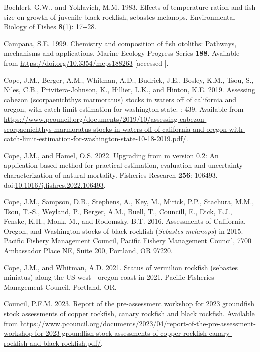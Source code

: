 \documentclass[11pt,
  english,
  letterpaper,
]{article}
\newlength{\cslhangindent}
\newenvironment{CSLReferences}[2] %
 {%
  \setlength{\parindent}{0pt}
  \ifodd #1 \everypar{\setlength{\hangindent}{\cslhangindent}}\ignorespaces\fi
  \ifnum #2 > 0
  \setlength{\parskip}{#2\baselineskip}
  \fi
 }%
 {}
\begin{document}
\begin{CSLReferences}{1}{0}
\leavevmode{}%
Boehlert, G.W., and Yoklavich, M.M. 1983. Effects of temperature ration and fish size on growth of juvenile black rockfish, sebastes melanops. Environmental Biology of Fishes \textbf{8}(1): 17-\/-28.

\leavevmode{}%
Campana, S.E. 1999. Chemistry and composition of fish otoliths: Pathways, mechanisms and applications. Marine Ecology Progress Series \textbf{188}. Available from \url{https://doi.org/10.3354/meps188263} {[}accessed {]}.

\leavevmode{}%
Cope, J.M., Berger, A.M., Whitman, A.D., Budrick, J.E., Bosley, K.M., Tsou, S., Niles, C.B., Privitera-Johnson, K., Hillier, L.K., and Hinton, K.E. 2019. Assessing cabezon (scorpaenichthys marmoratus) stocks in waters off of california and oregon, with catch limit estimation for washington state. : 439. Available from \url{https://www.pcouncil.org/documents/2019/10/assessing-cabezon-scorpaenichthys-marmoratus-stocks-in-waters-off-of-california-and-oregon-with-catch-limit-estimation-for-washington-state-10-18-2019.pdf/}.

\leavevmode{}%
Cope, J.M., and Hamel, O.S. 2022. Upgrading from m version 0.2: An application-based method for practical estimation, evaluation and uncertainty characterization of natural mortality. Fisheries Research \textbf{256}: 106493. doi:\href{https://doi.org/10.1016/j.fishres.2022.106493}{10.1016/j.fishres.2022.106493}.

\leavevmode{}%
Cope, J.M., Sampson, D.B., Stephens, A., Key, M., Mirick, P.P., Stachura, M.M., Tsou, T.-S., Weyland, P., Berger, A.M., Buell, T., Councill, E., Dick, E.J., Fenske, K.H., Monk, M., and Rodomsky, B.T. 2016. Assessments of {California}, {Oregon}, and {Washington} stocks of black rockfish (\emph{{Sebastes} melanops}) in 2015. Pacific Fishery Management Council, Pacific Fishery Management Council, 7700 Ambassador Place NE, Suite 200, Portland, OR 97220.

\leavevmode{}%
Cope, J.M., and Whitman, A.D. 2021. Status of vermilion rockfish (sebastes miniatus) along the {US} west - oregon coast in 2021. Pacific Fisheries Management Council, Portland, {OR}.

\leavevmode{}%
Council, P.F.M. 2023. Report of the pre-assessment workshop for 2023 groundfish stock assessments of copper rockfish, canary rockfish and black rockfish. Available from \url{https://www.pcouncil.org/documents/2023/04/report-of-the-pre-assessment-workshop-for-2023-groundfish-stock-assessments-of-copper-rockfish-canary-rockfish-and-black-rockfish.pdf/}.


\end{CSLReferences}
\end{document}
